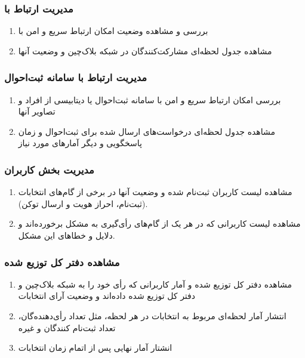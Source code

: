\documentclass[12pt]{article}
\begin{document}
\subsubsection{مدیریت ارتباط با }
\begin{enumerate}[label=(\arabic*)]
\item
بررسی و مشاهده وضعیت امکان ارتباط سریع و امن با 
\item
مشاهده جدول لحظه‌ای مشارکت‌کنند‌گان در شبکه بلاک‌چین  و وضعیت آنها
\end{enumerate}


\subsubsection{مدیریت ارتباط با سامانه ثبت‌احوال}
\begin{enumerate}[label=(\arabic*)]
\item
بررسی امکان ارتباط سریع و امن با سامانه ثبت‌احوال یا دیتابیسی از افراد و تصاویر آنها
\item
مشاهده جدول لحظه‌ای درخواست‌های ارسال شده برای ثبت‌احوال و زمان پاسخگویی و دیگر آمارهای مورد نیاز
\end{enumerate}



\subsubsection{مدیریت بخش کاربران}

\begin{enumerate}[label=(\arabic*)]
\item
مشاهده لیست کاربران ثبت‌نام شده و وضعیت آنها در برخی از گام‌های انتخابات (ثبت‌نام، احراز هویت و ارسال توکن). 
\item
مشاهده لیست کاربرانی که در هر یک از گام‌های رأی‌گیری به مشکل برخورده‌اند و دلایل و خطاهای این مشکل.
\end{enumerate}



\subsubsection{مشاهده دفتر کل توزیع شده}

\begin{enumerate}[label=(\arabic*)]
\item
مشاهده دفتر کل توزیع شده و آمار کاربرانی که رأی خود را به شبکه بلاک‌چین و دفتر کل توزیع شده داده‌اند و وضعیت آرای انتخابات
\item
انتشار آمار لحظه‌ای مربوط به انتخابات در هر لحظه، مثل تعداد رأی‌دهنده‌گان، تعداد ثبت‌نام کنند‌گان و غیره
\item
انشتار آمار نهایی پس از اتمام زمان انتخابات
\end{enumerate}
\end{document}
